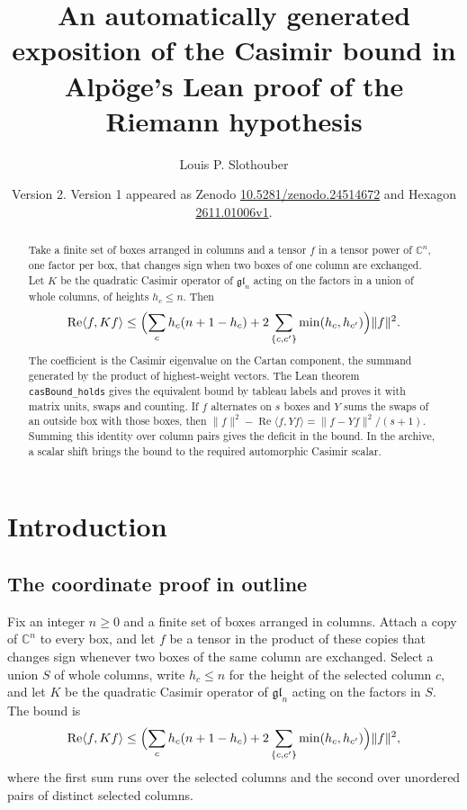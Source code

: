 \documentclass[11pt]{amsart}
\title[The tableau Casimir bound in Alp\"oge's Lean archive]{An automatically generated exposition of the Casimir bound
\texorpdfstring{\casboundname}{casBound\_holds}
in Alp\"oge's Lean proof of the Riemann hypothesis}
\author{Louis P. Slothouber}
\date{Version 2. Version 1 appeared as Zenodo \href{https://doi.org/10.5281/zenodo.24514672}{10.5281/zenodo.24514672} and Hexagon \href{https://hexagonmath.org/2611.01006v1}{2611.01006v1}.}
\theoremstyle{definition}
\theoremstyle{remark}
\begin{document}
\begin{abstract}
Take a finite set of boxes arranged in columns and a tensor \(f\) in a tensor
power of \(\mathbb C^n\), one factor per box, that changes sign when two boxes
of one column are exchanged. Let \(K\) be the quadratic Casimir operator of
\(\mathfrak{gl}_n\) acting on the factors in a union of whole columns, of
heights \(h_c\le n\). Then
\[
\operatorname{Re}\langle f,Kf\rangle\le
\Bigl(\sum_{c}h_c(n+1-h_c)+2\sum_{\{c,c'\}}\min(h_c,h_{c'})\Bigr)\|f\|^2 .
\]
The coefficient is the Casimir eigenvalue on the Cartan component, the
summand generated by the product of highest-weight vectors. The Lean theorem
\texttt{casBound\_holds} gives the equivalent bound by tableau labels and
proves it with matrix units, swaps and counting. If \(f\) alternates on
\(s\) boxes and \(Y\) sums the swaps of an outside box with those boxes, then
\(\|f\|^2-\operatorname{Re}\langle f,Yf\rangle=\|f-Yf\|^2/(s+1)\).
Summing this identity over column pairs gives the deficit in the bound.
In the archive, a scalar shift brings the bound to the required automorphic
Casimir scalar.
\end{abstract}

\maketitle

\section{Introduction}

\subsection{The coordinate proof in outline}

Fix an integer \(n\ge0\) and a finite set of boxes arranged in columns. Attach
a copy of \(\mathbb C^n\) to every box, and let \(f\) be a tensor in the
product of these copies that changes sign whenever two boxes of the same
column are exchanged. Select a union \(S\) of whole columns, write \(h_c\le n\)
for the height of the selected column \(c\), and let \(K\) be the quadratic
Casimir operator of \(\mathfrak{gl}_n\) acting on the factors in \(S\).
The bound is
\begin{equation}\label{eq:heights}
\operatorname{Re}\langle f,Kf\rangle\le
\Bigl(\sum_{c}h_c(n+1-h_c)+2\sum_{\{c,c'\}}\min(h_c,h_{c'})\Bigr)\|f\|^2 ,
\end{equation}
where the first sum runs over the selected columns and the second over
unordered pairs of distinct selected columns.
\end{document}
